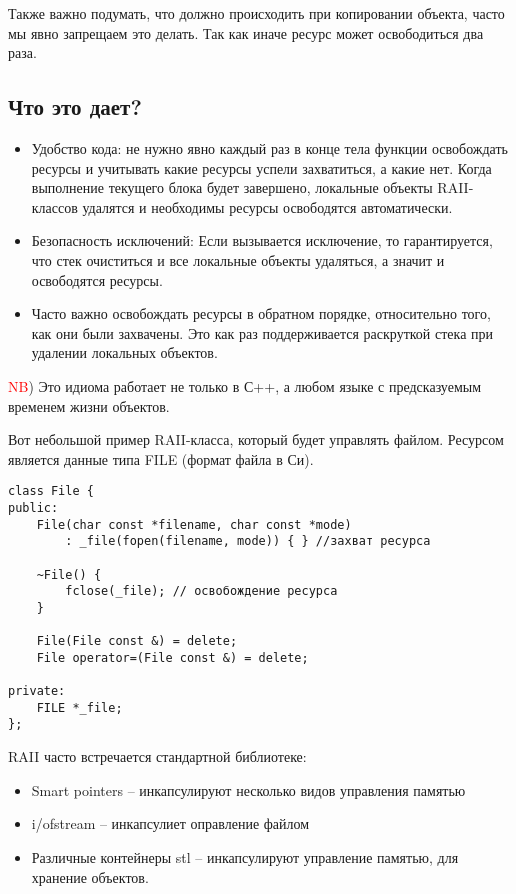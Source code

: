 Также важно подумать, что должно происходить при копировании объекта, часто мы явно запрещаем это делать. Так как иначе ресурс может освободиться два раза.

\subsection{Что это дает?}
\begin{itemize}
\item Удобство кода: не нужно явно каждый раз в конце тела функции освобождать ресурсы и учитывать какие ресурсы успели захватиться, а какие нет. Когда выполнение текущего блока будет завершено, локальные объекты RAII-классов удалятся и необходимы ресурсы освободятся автоматически.
\item Безопасность исключений: Если вызывается исключение, то гарантируется, что стек очиститься и все локальные объекты удаляться, а значит и освободятся ресурсы.
\item Часто важно освобождать ресурсы в обратном порядке, относительно того, как они были захвачены. Это как раз поддерживается раскруткой стека при удалении локальных объектов.
\end{itemize}

\textcolor{red}{NB}) Это идиома работает не только в С++, а любом языке с предсказуемым временем жизни объектов.


Вот небольшой пример RAII-класса, который будет управлять файлом.
Ресурсом является данные типа FILE (формат файла в Си).
\begin{verbatim}
class File {
public:
    File(char const *filename, char const *mode)
        : _file(fopen(filename, mode)) { } //захват ресурса

    ~File() {
        fclose(_file); // освобождение ресурса
    }

    File(File const &) = delete;
    File operator=(File const &) = delete;

private:
    FILE *_file;
};
\end{verbatim}

RAII часто встречается стандартной библиотеке:
\begin{itemize}
\item Smart pointers -- инкапсулируют несколько видов управления памятью
\item i/ofstream -- инкапсулиет оправление файлом
\item Различные контейнеры stl -- инкапсулируют управление памятью, для хранение объектов.
\end{itemize}

